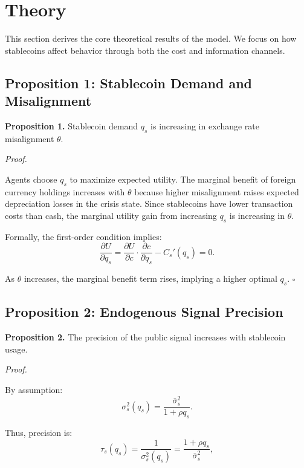 \section{Theory}

This section derives the core theoretical results of the model. We focus on how stablecoins affect behavior through both the cost and information channels.

\subsection{Proposition 1: Stablecoin Demand and Misalignment}

\textbf{Proposition 1.} Stablecoin demand $q_s$ is increasing in exchange rate misalignment $\theta$.

\textit{Proof.} 

Agents choose $q_s$ to maximize expected utility. The marginal benefit of foreign currency holdings increases with $\theta$ because higher misalignment raises expected depreciation losses in the crisis state. Since stablecoins have lower transaction costs than cash, the marginal utility gain from increasing $q_s$ is increasing in $\theta$.

Formally, the first-order condition implies:
\begin{equation}
\frac{\partial U}{\partial q_s} = \frac{\partial U}{\partial c} \cdot \frac{\partial c}{\partial q_s} - C_s'(q_s) = 0.
\end{equation}

As $\theta$ increases, the marginal benefit term rises, implying a higher optimal $q_s$. \hfill $\square$

\subsection{Proposition 2: Endogenous Signal Precision}

\textbf{Proposition 2.} The precision of the public signal increases with stablecoin usage.

\textit{Proof.}

By assumption:
\begin{equation}
\sigma_s^2(q_s) = \frac{\bar{\sigma}_s^2}{1 + \rho q_s}.
\end{equation}

Thus, precision is:
\begin{equation}
\tau_s(q_s) = \frac{1}{\sigma_s^2(q_s)} = \frac{1 + \rho q_s}{\bar{\sigma}_s^2},
\end{equation}

